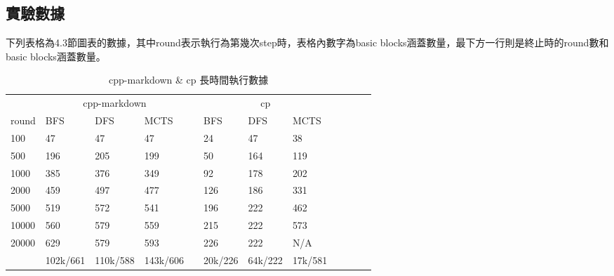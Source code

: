 \documentclass[12pt,a4paper,oneside]{book}
\begin{document}
\begin{appendices}
\chapter{實驗數據}

下列表格為4.3節圖表的數據，其中round表示執行為第幾次step時，表格內數字為basic blocks涵蓋數量，最下方一行則是終止時的round數和basic blocks涵蓋數量。

\begin{table}[htbp]
\centering
\caption{cpp-markdown \& cp 長時間執行數據}
\label{large1}
\begin{tabular}{@{}llllllllllll@{}} \toprule
             & \multicolumn{3}{c}{cpp-markdown} & \phantom{abc} & \multicolumn{3}{c}{cp} \\ \cmidrule{2-4} \cmidrule{6-8}
round      & BFS   & DFS  & MCTS & & BFS   & DFS & MCTS     \\ \midrule
100        & 47    & 47   & 47   & & 24    & 47  & 38       \\
500        & 196   & 205  & 199  & & 50    & 164 & 119      \\
1000       & 385   & 376  & 349  & & 92    & 178 & 202      \\
2000       & 459   & 497  & 477  & & 126   & 186 & 331      \\
5000       & 519   & 572  & 541  & & 196   & 222 & 462      \\
10000      & 560   & 579  & 559  & & 215   & 222 & 573      \\
20000      & 629   & 579  & 593  & & 226   & 222 & N/A      \\
& 102k/661 & 110k/588 & 143k/606 & & 20k/226 & 64k/222 & 17k/581     \\ \bottomrule
\end{tabular}
\end{table}


\end{appendices}
\end{document}
